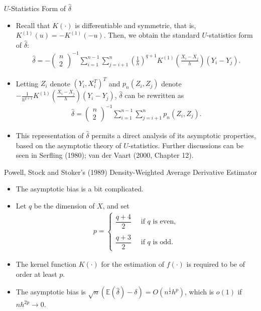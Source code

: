 \documentclass[xcolor=svgnames,dvipdfmx,cjk]{beamer}
\theoremstyle{example}
\def\E{\mathbb{E}}
\begin{document}
\begin{frame}{$U$-Statistics Form of $\hat{\delta}$}
 \begin{itemize}
  \item Recall that $K(\cdot)$ is differentiable and symmetric, that is,
        $K^{(1)}(u) = -K^{(1)}(-u)$. Then, we obtain the standard $U$-statistics form of $\hat{\delta}$:
        \begin{align*}
          \hat{\delta} 
          =
          - \begin{pmatrix}  
            n \\ 2
          \end{pmatrix}^{-1}
          \sum_{i=1}^{n-1} \sum_{j=i+1}^{n}
          \left( \frac{1}{h} \right)^{q+1}
          K^{(1)} \left( \frac{X_i - X_j}{h} \right)
          (Y_i - Y_j).
        \end{align*}
  \item Letting $Z_i$ denote $(Y_i, X_i^T)^T$ 
        and $p_n(Z_i, Z_j)$ denote $-\frac{1}{h^{q+1}}K^{(1)} \left( \frac{X_i - X_j}{h} \right)(Y_i - Y_j)$,
        $\hat{\delta}$ can be rewritten as
        \begin{align*}
          \hat{\delta}
          =
          \begin{pmatrix}  
            n \\ 2
          \end{pmatrix}^{-1}
          \sum_{i=1}^{n-1} \sum_{j=i+1}^{n}
          p_n(Z_i, Z_j).
        \end{align*}
  \item This representation of $\hat{\delta}$ permits a direct analysis of its asymptotic properties, 
        based on the asymptotic theory of $U$-statistics.
        Further discussions can be seen in Serfling (1980); van der Vaart (2000, Chapter 12).
 \end{itemize} 
\end{frame}

\begin{frame}{Powell, Stock and Stoker's (1989) Density-Weighted Average Derivative Estimator}
\begin{itemize}
  \item The asymptotic bias is a bit complicated.
  \item Let $q$ be the dimension of $X$, and set 
        \begin{align*}
          p = \left\{
            \begin{array}{l}
              \dfrac{q+4}{2} \quad \text{ if } q \text{ is even}, 
              \\ \\
              \dfrac{q+3}{2} \quad \text{ if } q \text{ is odd}.
            \end{array}
            \right.
        \end{align*}
  \item The kernel function $K(\cdot)$ for the estimation of $f(\cdot)$ is required to be of order at least $p$.
  \item The asymptotic bias is 
        $\sqrt{n}(\E(\hat{\delta}) - \delta) = O(n^{\frac{1}{2}}h^p)$,
        which is $o(1)$ if $nh^{2p} \to 0$.
\end{itemize}  
\end{frame}
\end{document}
